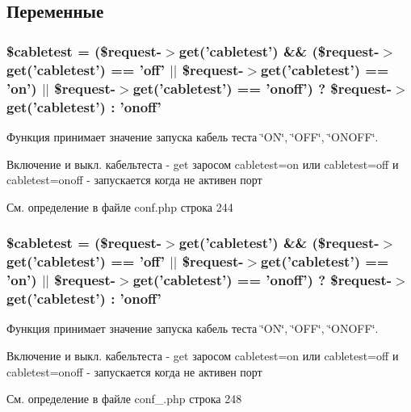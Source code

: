 \subsection{Переменные}
\hypertarget{group__on__off__cabletest_ga8a066b0c14b92b0fce632e27b8dd35c9}{
\subsubsection[{\$cabletest}]{\setlength{\rightskip}{0pt plus 5cm}\$cabletest = (\$request-\/$>$get('cabletest') \&\& (\$request-\/$>$get('cabletest') == 'off' $\vert$$\vert$ \$request-\/$>$get('cabletest') == 'on') $\vert$$\vert$ \$request-\/$>$get('cabletest') == 'onoff') ? \$request-\/$>$get('cabletest') \-: 'onoff'}}\label{group__on__off__cabletest_ga8a066b0c14b92b0fce632e27b8dd35c9}


Функция принимает значение запуска кабель теста \char`\"{}\-O\-N\char`\"{}, \char`\"{}\-O\-F\-F\char`\"{}, \char`\"{}\-O\-N\-O\-F\-F\char`\"{}. 

Включение и выкл. кабельтеста -\/ get заросом cabletest=on или cabletest=off и cabletest=onoff -\/ запускается когда не активен порт 

См. определение в файле conf.\-php строка 244

\hypertarget{group__on__off__cabletest_ga8a066b0c14b92b0fce632e27b8dd35c9}{
\subsubsection[{\$cabletest}]{\setlength{\rightskip}{0pt plus 5cm}\$cabletest = (\$request-\/$>$get('cabletest') \&\& (\$request-\/$>$get('cabletest') == 'off' $\vert$$\vert$ \$request-\/$>$get('cabletest') == 'on') $\vert$$\vert$ \$request-\/$>$get('cabletest') == 'onoff') ? \$request-\/$>$get('cabletest') \-: 'onoff'}}\label{group__on__off__cabletest_ga8a066b0c14b92b0fce632e27b8dd35c9}


Функция принимает значение запуска кабель теста \char`\"{}\-O\-N\char`\"{}, \char`\"{}\-O\-F\-F\char`\"{}, \char`\"{}\-O\-N\-O\-F\-F\char`\"{}. 

Включение и выкл. кабельтеста -\/ get заросом cabletest=on или cabletest=off и cabletest=onoff -\/ запускается когда не активен порт 

См. определение в файле conf\-\_\-.\-php строка 248

